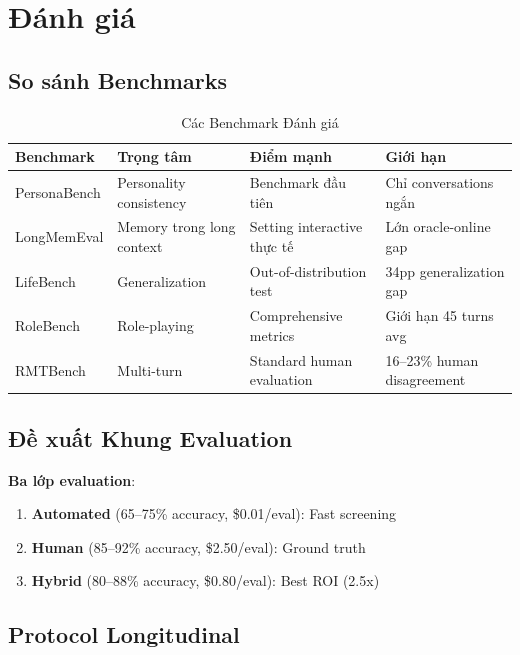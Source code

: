 \section{Đánh giá}

\subsection{So sánh Benchmarks}

\begin{table}[H]
\centering
\caption{Các Benchmark Đánh giá}
\label{tab:benchmarks}
\begin{tabular}{llll}
\toprule
\textbf{Benchmark} & \textbf{Trọng tâm} & \textbf{Điểm mạnh} & \textbf{Giới hạn} \\
\midrule
PersonaBench & Personality consistency & Benchmark đầu tiên & Chỉ conversations ngắn \\
LongMemEval & Memory trong long context & Setting interactive thực tế & Lớn oracle-online gap \\
LifeBench & Generalization & Out-of-distribution test & 34pp generalization gap \\
RoleBench & Role-playing & Comprehensive metrics & Giới hạn 45 turns avg \\
RMTBench & Multi-turn & Standard human evaluation & 16--23\% human disagreement \\
\bottomrule
\end{tabular}
\end{table}

\subsection{Đề xuất Khung Evaluation}

\textbf{Ba lớp evaluation}:
\begin{enumerate}
    \item \textbf{Automated} (65--75\% accuracy, \$0.01/eval): Fast screening
    \item \textbf{Human} (85--92\% accuracy, \$2.50/eval): Ground truth
    \item \textbf{Hybrid} (80--88\% accuracy, \$0.80/eval): Best ROI (2.5x)
\end{enumerate}

\subsection{Protocol Longitudinal}

